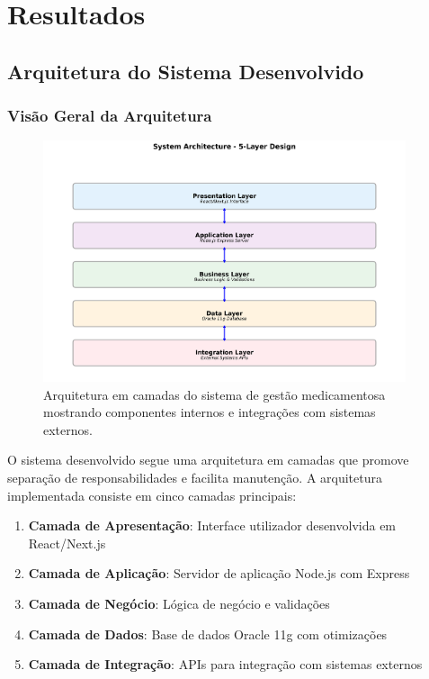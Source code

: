 \chapter{Resultados}

\section{Arquitetura do Sistema Desenvolvido}

\subsection{Visão Geral da Arquitetura}

\begin{figure}[htbp]
    \centering
    \includegraphics[width=0.95\textwidth]{images/generated/system_architecture.png}
    \caption{Arquitetura em camadas do sistema de gestão medicamentosa mostrando componentes internos e integrações com sistemas externos.}
    \label{fig:architecture}
\end{figure}

O sistema desenvolvido segue uma arquitetura em camadas que promove separação de responsabilidades e facilita manutenção. A arquitetura implementada consiste em cinco camadas principais:

\begin{enumerate}
    \item \textbf{Camada de Apresentação}: Interface utilizador desenvolvida em React/Next.js
    \item \textbf{Camada de Aplicação}: Servidor de aplicação Node.js com Express
    \item \textbf{Camada de Negócio}: Lógica de negócio e validações
    \item \textbf{Camada de Dados}: Base de dados Oracle 11g com otimizações
    \item \textbf{Camada de Integração}: APIs para integração com sistemas externos
\end{enumerate}

